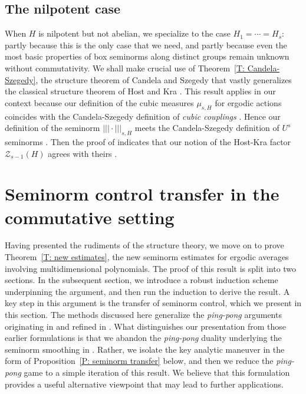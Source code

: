 \documentclass[11pt]{amsart}
\theoremstyle{definition}
\newcommand{\CZ}{{\mathcal Z}}
\newcommand{\nnorm}[1]{\lvert\!|\!| #1|\!|\!\rvert}
\newcommand{\1}{{\mathbf{1}}}
\begin{document}
 \subsection{The nilpotent case}
When $H$ is nilpotent but not abelian, we specialize to the case $H_1 = \cdots = H_s$: partly because this is the only case that we need, and partly because even the most basic properties of box seminorms along distinct groups remain unknown without commutativity. We shall make crucial use of Theorem~\ref{T: Candela-Szegedy}, the structure theorem of Candela and Szegedy \cite[Theorem~5.12]{CS23} that vastly generalizes the classical structure theorem of Host and Kra \cite{HK05a}. This result applies in our context because our definition of the cubic measures $\mu_{s,H}$ for ergodic actions coincides with the Candela-Szegedy definition of \textit{cubic couplings} \cite[Definition 5.4]{CS23}. Hence our definition of the seminorm $\nnorm{\cdot}_{s, H}$ meets the Candela-Szegedy definition of $U^s$ seminorms \cite[Definitions 3.15 and 5.7]{CS23}. Then the proof of \cite[Lemma~5.8]{CS23} indicates that our notion of the Host-Kra factor $\CZ_{s-1}(H)$ agrees with theirs \cite[Definition 5.9]{CS23}.




\section{Seminorm control transfer in the commutative setting}\label{S: control transfer}
Having presented the rudiments of the structure theory, we move on to prove Theorem~\ref{T: new estimates}, the new seminorm estimates for ergodic averages involving multidimensional polynomials. The proof of this result is split into two sections. In the subsequent section, we introduce a robust induction scheme underpinning the argument, and then run the induction to derive the result. A key step in this argument is the transfer of seminorm control, which we present in this section. The methods discussed here generalize the \textit{ping-pong} arguments originating in \cite{FrKu22a} and refined in \cite{DKKST25, DKKST24, FrKu22b, Kuc23}. What distinguishes our presentation from those earlier formulations is that we abandon the \textit{ping-pong} duality underlying the seminorm smoothing in \cite{DKKST25, DKKST24, FrKu22b, FrKu22a, Kuc23}. Rather, we isolate the key analytic maneuver in the form of Proposition~\ref{P: seminorm transfer} below, and then we reduce the \textit{ping-pong} game to a simple iteration of this result. We believe that this formulation provides a useful alternative viewpoint that may lead to further applications. 
\end{document}
